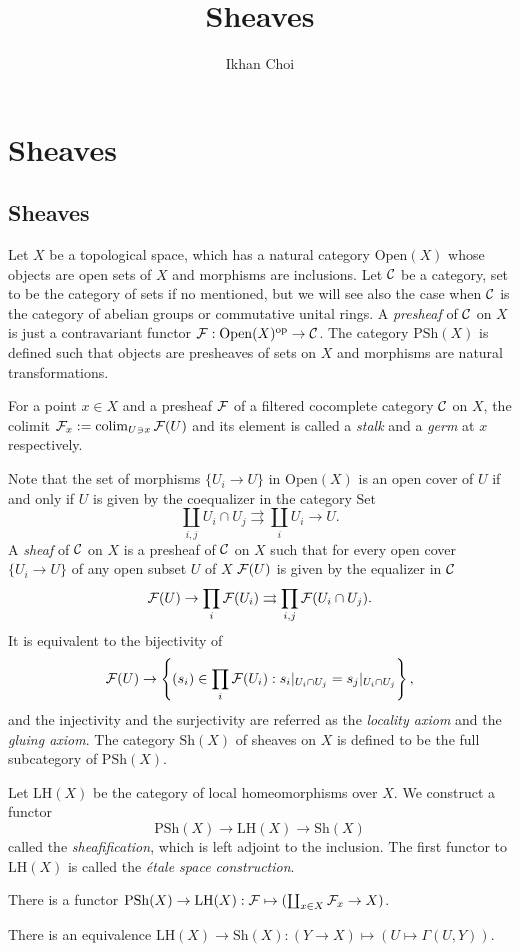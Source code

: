\documentclass{../../large}
\newcommand{\PSh}{\mathrm{PSh}}
\newcommand{\Sh}{\mathrm{Sh}}
\newcommand{\Open}{\mathrm{Open}}
\begin{document}
\title{Sheaves}
\author{Ikhan Choi}
\maketitle
\tableofcontents




\part{Sheaves}

\chapter{Sheaves}




\begin{prb}[Sheaves]
Let $X$ be a topological space, which has a natural category $\Open(X)$ whose objects are open sets of $X$ and morphisms are inclusions.
Let $\mathcal{C}$ be a category, set to be the category of sets if no mentioned, but we will see also the case when $\mathcal{C}$ is the category of abelian groups or commutative unital rings.
A \emph{presheaf} of $\mathcal{C}$ on $X$ is just a contravariant functor $\cF:\Open(X)^\op\to\cC$.
The category $\PSh(X)$ is defined such that objects are presheaves of sets on $X$ and morphisms are natural transformations.

For a point $x\in X$ and a presheaf $\mathcal{F}$ of a filtered cocomplete category $\mathcal{C}$ on $X$, the colimit $\mathcal{F}_x:=\operatorname*{colim}_{U\ni x}\mathcal{F}(U)$ and its element is called a \emph{stalk} and a \emph{germ} at $x$ respectively.

Note that the set of morphisms $\{U_i\to U\}$ in $\Open(X)$ is an open cover of $U$ if and only if $U$ is given by the coequalizer in the category $\mathrm{Set}$
\[\coprod_{i,j}U_i\cap U_j\rightrightarrows\coprod_iU_i\to U.\]
A \emph{sheaf} of $\mathcal{C}$ on $X$ is a presheaf of $\mathcal{C}$ on $X$ such that for every open cover $\{U_i\to U\}$ of any open subset $U$ of $X$ $\mathcal{F}(U)$ is given by the equalizer in $\mathcal{C}$
\[\mathcal{F}(U)\to\prod_i\mathcal{F}(U_i)\rightrightarrows\prod_{i,j}\mathcal{F}(U_i\cap U_j).\]
It is equivalent to the bijectivity of
\[\mathcal{F}(U)\to\left\{(s_i)\in\prod_i\mathcal{F}(U_i):s_i|_{U_i\cap U_j}=s_j|_{U_i\cap U_j}\right\},\]
and the injectivity and the surjectivity are referred as the \emph{locality axiom} and the \emph{gluing axiom}.
The category $\Sh(X)$ of sheaves on $X$ is defined to be the full subcategory of $\PSh(X)$.

Let $\mathrm{LH}(X)$ be the category of local homeomorphisms over $X$.
We construct a functor
\[\PSh(X)\to\mathrm{LH}(X)\to\Sh(X)\]
called the \emph{sheafification}, which is left adjoint to the inclusion.
The first functor to $\mathrm{LH}(X)$ is called the \emph{\'etale space construction}.
\begin{parts}
\item There is a functor $\PSh(X)\to\mathrm{LH}(X):\cF\mapsto(\coprod_{x\in X}\cF_x\to X)$.
\item There is an equivalence $\mathrm{LH}(X)\to\Sh(X):(Y\to X)\mapsto(U\mapsto\Gamma(U,Y))$.
\end{parts}
\end{prb}
\end{document}
